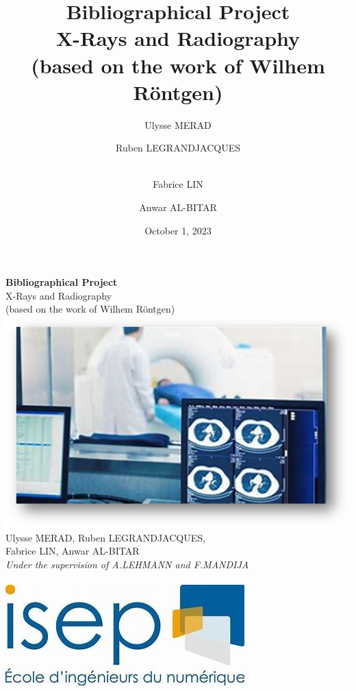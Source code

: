 \documentclass[a4paper,12pt]{report}
\title{Bibliographical Project \\ [1ex]\large X-Rays and Radiography \\ (based on the work of Wilhem Röntgen)  }
\author{Ulysse MERAD\and Ruben LEGRANDJACQUES \and \\Fabrice LIN \and Anwar AL-BITAR}
\date{October 1, 2023}
\begin{document}
\begin{titlepage}
  \centering
  \vspace{3cm}
  \Huge{\textbf{Bibliographical Project}}\\
  \vspace{1cm}
  \Large{X-Rays and Radiography \\ (based on the work of Wilhem Röntgen)} \\
  \vspace{0.5cm}
  \includegraphics[scale=1]{xray.png}\\
  \vspace{0.5cm}
  Ulysse MERAD, Ruben LEGRANDJACQUES, \\ [0.5ex] Fabrice LIN, Anwar AL-BITAR \\
  \vspace{1.5cm}
  \large{\textit {Under the supervision of A.LEHMANN and F.MANDIJA}} \\
  \vspace{1.5cm}
  \thedate \\
  \vspace{2cm}
  \includegraphics[scale=0.6]{Isep.jpg}\\
  
\end{titlepage}
\end{document}
